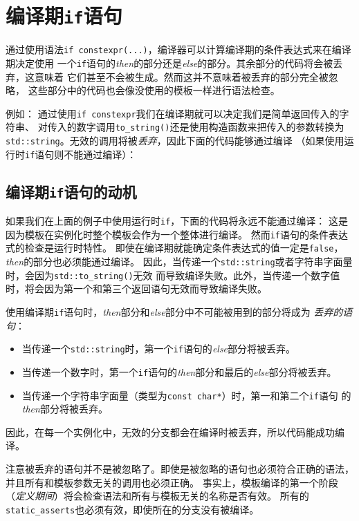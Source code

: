 \chapter{编译期\texttt{if}语句}\label{ch10}
通过使用语法\texttt{if constexpr(...)}，编译器可以计算编译期的条件表达式来在编译期决定使用
一个\texttt{if}语句的\emph{then}的部分还是\emph{else}的部分。其余部分的代码将会被丢弃，这意味着
它们甚至不会被生成。然而这并不意味着被丢弃的部分完全被忽略，
这些部分中的代码也会像没使用的模板一样进行语法检查。

例如：
通过使用\texttt{if constexpr}我们在编译期就可以决定我们是简单返回传入的字符串、
对传入的数字调用\texttt{to\_string()}还是使用构造函数来把传入的参数转换为
\texttt{std::string}。无效的调用将被\emph{丢弃}，因此下面的代码能够通过编译
（如果使用运行时\texttt{if}语句则不能通过编译）：

\section{编译期\texttt{if}语句的动机}
如果我们在上面的例子中使用运行时\texttt{if}，下面的代码将永远不能通过编译：
这是因为模板在实例化时整个模板会作为一个整体进行编译。
然而\texttt{if}语句的条件表达式的检查是运行时特性。
即使在编译期就能确定条件表达式的值一定是\texttt{false}，\emph{then}的部分也必须能通过编译。
因此，当传递一个\texttt{std::string}或者字符串字面量时，会因为\texttt{std::to\_string()}无效
而导致编译失败。此外，当传递一个数字值时，将会因为第一个和第三个返回语句无效而导致编译失败。

使用编译期\texttt{if}语句时，\emph{then}部分和\emph{else}部分中不可能被用到的部分将成为
\emph{丢弃的语句}：
\begin{itemize}
    \item 当传递一个\texttt{std::string}时，第一个\texttt{if}语句的\emph{else}部分将被丢弃。
    \item 当传递一个数字时，第一个\texttt{if}语句的\emph{then}部分和最后的\emph{else}部分将被丢弃。
    \item 当传递一个字符串字面量（类型为\texttt{const char*}）时，第一和第二个\texttt{if}语句
    的\emph{then}部分将被丢弃。
\end{itemize}
因此，在每一个实例化中，无效的分支都会在编译时被丢弃，所以代码能成功编译。

注意被丢弃的语句并不是被忽略了。即使是被忽略的语句也必须符合正确的语法，
并且所有和模板参数无关的调用也必须正确。
事实上，模板编译的第一个阶段（\emph{定义期间}）将会检查语法和所有与模板无关的名称是否有效。
所有的\texttt{static\_asserts}也必须有效，即使所在的分支没有被编译。

